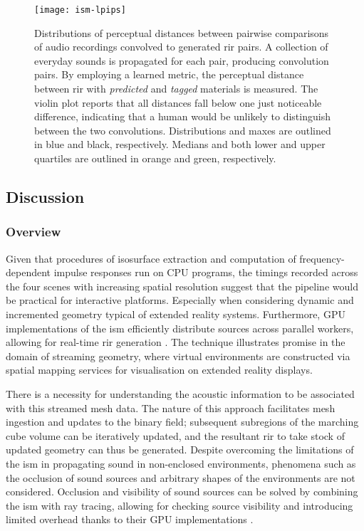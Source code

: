 \begin{figure}[htbp]
 \centering %
 \texttt{[image: ism-lpips]}
 \caption[Image-Source Model-based acoustic rendering --- Perceptual evaluation results]{Distributions of perceptual distances between pairwise comparisons of audio recordings convolved to generated \acrshort{rir} pairs.
A collection of everyday sounds is propagated for each pair, producing convolution pairs. By employing a learned metric, the perceptual distance between \acrshort{rir} with \emph{predicted} and \emph{tagged} materials is measured. The violin plot reports that all distances fall below one just noticeable difference, indicating that a human would be unlikely to distinguish between the two convolutions. Distributions and maxes are outlined in blue and black, respectively. Medians and both lower and upper quartiles are outlined in orange and green, respectively.}\label{fig:ism_perceptual_evaluation}
\end{figure}

\subsection{Discussion}
\subsubsection{Overview}
Given that procedures of isosurface extraction and computation of frequency-dependent impulse responses run on CPU programs, the timings recorded across the four scenes with increasing spatial resolution suggest that the pipeline would be practical for interactive platforms. Especially when considering dynamic and incremented geometry typical of extended reality systems. Furthermore, GPU implementations of the \acrshort{ism} efficiently distribute sources across parallel workers, allowing for real-time \acrshort{rir} generation \citep{diaz2021gpurir}. The technique illustrates promise in the domain of streaming geometry, where virtual environments are constructed via spatial mapping services for visualisation on extended reality displays.\par
There is a necessity for understanding the acoustic information to be associated with this streamed mesh data. The nature of this approach facilitates mesh ingestion and updates to the binary field; subsequent subregions of the marching cube volume can be iteratively updated, and the resultant \acrshort{rir} to take stock of updated geometry can thus be generated. Despite overcoming the limitations of the \acrshort{ism} in propagating sound in non-enclosed environments, phenomena such as the occlusion of sound sources and arbitrary shapes of the environments are not considered. Occlusion and visibility of sound sources can be solved by combining the \acrshort{ism} with ray tracing, allowing for checking source visibility and introducing limited overhead thanks to their GPU implementations \citep{taylor2012guided}.\par

